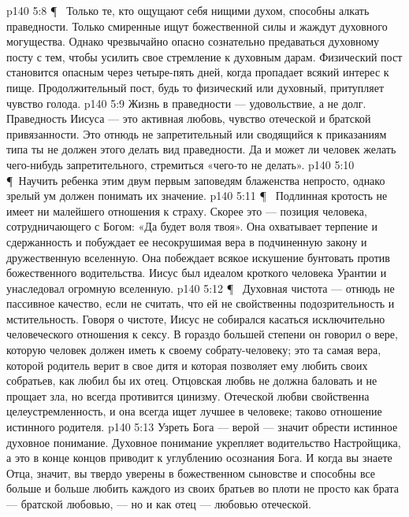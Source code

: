 \vs p140 5:8 \P\ \bibnobreakspace {} Только те, кто ощущают себя нищими духом, способны алкать праведности. Только смиренные ищут божественной силы и жаждут духовного могущества. Однако чрезвычайно опасно сознательно предаваться духовному посту с тем, чтобы усилить свое стремление к духовным дарам. Физический пост становится опасным через четыре\hyp{}пять дней, когда пропадает всякий интерес к пище. Продолжительный пост, будь то физический или духовный, притупляет чувство голода.
\vs p140 5:9 Жизнь в праведности --- удовольствие, а не долг. Праведность Иисуса --- это активная любовь, чувство отеческой и братской привязанности. Это отнюдь не запретительный или сводящийся к приказаниям типа ты не должен этого делать вид праведности. Да и может ли человек желать чего\hyp{}нибудь запретительного, стремиться «чего\hyp{}то не делать».
\vs p140 5:10 \P\ Научить ребенка этим двум первым заповедям блаженства непросто, однако зрелый ум должен понимать их значение.
\vs p140 5:11 \P\ \bibnobreakspace {} Подлинная кротость не имеет ни малейшего отношения к страху. Скорее это --- позиция человека, сотрудничающего с Богом: «Да будет воля твоя». Она охватывает терпение и сдержанность и побуждает ее несокрушимая вера в подчиненную закону и дружественную вселенную. Она побеждает всякое искушение бунтовать против божественного водительства. Иисус был идеалом кроткого человека Урантии и унаследовал огромную вселенную.
\vs p140 5:12 \P\ \bibnobreakspace {} Духовная чистота --- отнюдь не пассивное качество, если не считать, что ей не свойственны подозрительность и мстительность. Говоря о чистоте, Иисус не собирался касаться исключительно человеческого отношения к сексу. В гораздо большей степени он говорил о вере, которую человек должен иметь к своему собрату\hyp{}человеку; это та самая вера, которой родитель верит в свое дитя и которая позволяет ему любить своих собратьев, как любил бы их отец. Отцовская любвь не должна баловать и не прощает зла, но всегда противится цинизму. Отеческой любви свойственна целеустремленность, и она всегда ищет лучшее в человеке; таково отношение истинного родителя.
\vs p140 5:13 Узреть Бога --- верой --- значит обрести истинное духовное понимание. Духовное понимание укрепляет водительство Настройщика, а это в конце концов приводит к углублению осознания Бога. И когда вы знаете Отца, значит, вы твердо уверены в божественном сыновстве и способны все больше и больше любить каждого из своих братьев во плоти не просто как брата --- братской любовью, --- но и как отец --- любовью отеческой.
